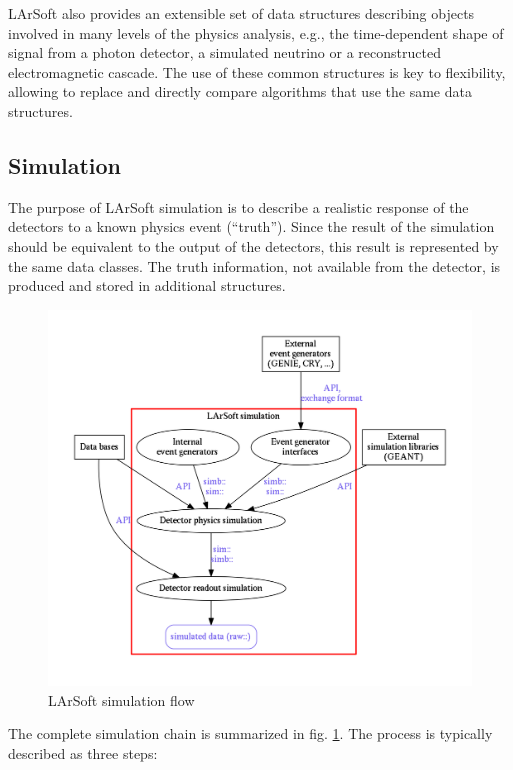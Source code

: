 LArSoft also provides an extensible set of data structures describing
objects involved in many levels of the physics analysis, e.g., the
time-dependent shape of signal from a photon detector, a simulated
neutrino or a reconstructed electromagnetic cascade. The use of these
common structures is key to flexibility, allowing to replace and
directly compare algorithms that use the same data structures.

\subsection{Simulation}\label{simulation}

The purpose of LArSoft simulation is to describe a realistic response of
the detectors to a known physics event (``truth''). Since the result of
the simulation should be equivalent to the output of the detectors, this
result is represented by the same data classes. The truth information,
not available from the detector, is produced and stored in additional
structures.

\begin{figure}[htbp]
\centering
\includegraphics[width=\textwidth]{figures/LArSoftSimulationGraph.pdf}
\caption{\label{fig:LArSoftsimulation}LArSoft simulation flow}
\end{figure}

The complete simulation chain is summarized in fig.
\ref{fig:LArSoftsimulation}. The process is typically described as three
steps:

